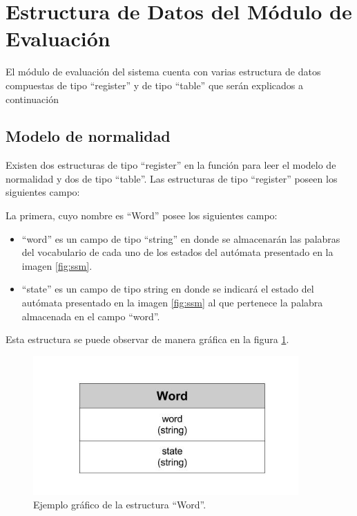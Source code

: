 \section{Estructura de Datos del Módulo de Evaluación}

El módulo de evaluación del sistema cuenta con varias estructura de datos compuestas de tipo ``register'' y de tipo ``table'' que serán explicados a continuación 

\subsection*{Modelo de normalidad}
\label{sssec:estructuraModelo}

Existen dos estructuras de tipo ``register'' en la función para leer el modelo de normalidad y dos de tipo ``table''.
Las estructuras de tipo ``register'' poseen los siguientes campo:

La primera, cuyo nombre es ``Word'' posee los siguientes campo:
\begin{itemize}
\item ``word'' es un campo de tipo ``string'' en donde se almacenarán las palabras del vocabulario de cada uno de los estados del autómata presentado en la imagen \ref{fig:ssm}.
\item ``state'' es un campo de tipo string en donde se indicará el estado del autómata presentado en la imagen \ref{fig:ssm} al que pertenece la palabra almacenada en el campo ``word''.
\end{itemize}

Esta estructura se puede observar de manera gráfica en la figura \ref{fig:WORD}.

\begin{figure}[!htb]
\begin{center}
\includegraphics[width=4in]{./img/Word.jpg}
\caption{Ejemplo gráfico de la estructura ``Word''.}
\label{fig:WORD}
\end{center}
\end{figure}	

